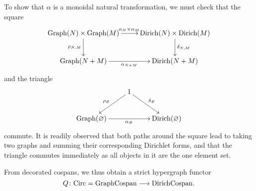 To show that $\alpha$ is a monoidal natural transformation, we must check that
the square
\[
\xymatrix{
  \mathrm{Graph}(N) \times \mathrm{Graph}(M) \ar[r]^{\alpha_N \times
  \alpha_M} \ar[d]_{\rho_{N,M}} & \mathrm{Dirich}(N) \times \mathrm{Dirich}(M)
  \ar[d]^{\delta_{N,M}}  \\
  \mathrm{Graph}(N+M) \ar[r]_{\alpha_{N+M}} & \mathrm{Dirich}(N+M)
}
\]
and the triangle
\[
\xymatrix{
  & 1 \ar[dl]_{\rho_\varnothing} \ar[dr]^{\delta_\varnothing}\\
\mathrm{Graph}(\varnothing)  \ar[rr]_{\alpha_\varnothing} &&
\mathrm{Dirich}(\varnothing)
}
\]
commute. It is readily observed that both paths around the square lead to taking
two graphs and summing their corresponding Dirichlet forms, and that the
triangle commutes immediately as all objects in it are the one element set.

From decorated cospans, we thus obtain a strict hypergraph functor
\[
  Q {\colon} \mathrm{Circ} = \mathrm{GraphCospan} \longrightarrow \mathrm{DirichCospan}.
\]

